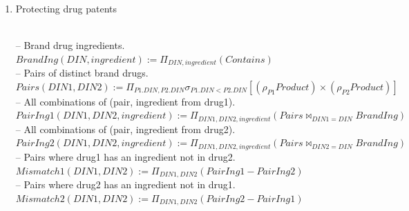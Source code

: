 \documentclass{article}
\newcommand{\var}[1]{\mathit{#1}}
\begin{document}
\begin{enumerate}
{-- Shortage drugs. \\[5pt]
$
Shortage(\var{DIN}) :=
  ThreeUnfilled \cap TwoPatients
$ \\[10pt]

-- Manufacturer information. \\[5pt]
$
Answer(\var{DIN}, \var{manufacturer}) :=
  Shortage \bowtie
  (\Pi_{\var{DIN}, \var{manufacturer}}(\var{Product})
   \cup
   \Pi_{\var{DIN}, \var{manufacturer}}(\var{Generic}))
$
}

\item {\large Protecting drug patents}

{~}\\
{\large
-- Brand drug ingredients. \\[5pt]
$
BrandIng(\var{DIN}, \var{ingredient}) :=
  \Pi_{\var{DIN}, \var{ingredient}}(\var{Contains})
$ \\[10pt]

-- Pairs of distinct brand drugs. \\[5pt]
$
Pairs(\var{DIN1}, \var{DIN2}) :=
  \Pi_{P1.\var{DIN}, P2.\var{DIN}}
  \sigma_{P1.\var{DIN} < P2.\var{DIN}}
  [ (\rho_{P1}\var{Product}) \times (\rho_{P2}\var{Product}) ]
$ \\[10pt]

-- All combinations of (pair, ingredient from drug1). \\[5pt]
$
PairIng1(\var{DIN1}, \var{DIN2}, \var{ingredient}) :=
  \Pi_{\var{DIN1}, \var{DIN2}, \var{ingredient}}
  (Pairs \bowtie_{\var{DIN1} = \var{DIN}} BrandIng)
$ \\[10pt]

-- All combinations of (pair, ingredient from drug2). \\[5pt]
$
PairIng2(\var{DIN1}, \var{DIN2}, \var{ingredient}) :=
  \Pi_{\var{DIN1}, \var{DIN2}, \var{ingredient}}
  (Pairs \bowtie_{\var{DIN2} = \var{DIN}} BrandIng)
$ \\[10pt]

-- Pairs where drug1 has an ingredient not in drug2. \\[5pt]
$
Mismatch1(\var{DIN1}, \var{DIN2}) :=
  \Pi_{\var{DIN1}, \var{DIN2}}(PairIng1 - PairIng2)
$ \\[10pt]

-- Pairs where drug2 has an ingredient not in drug1. \\[5pt]
$
Mismatch2(\var{DIN1}, \var{DIN2}) :=
  \Pi_{\var{DIN1}, \var{DIN2}}(PairIng2 - PairIng1)
$ \\[10pt]

}
\end{enumerate}
\end{document}
